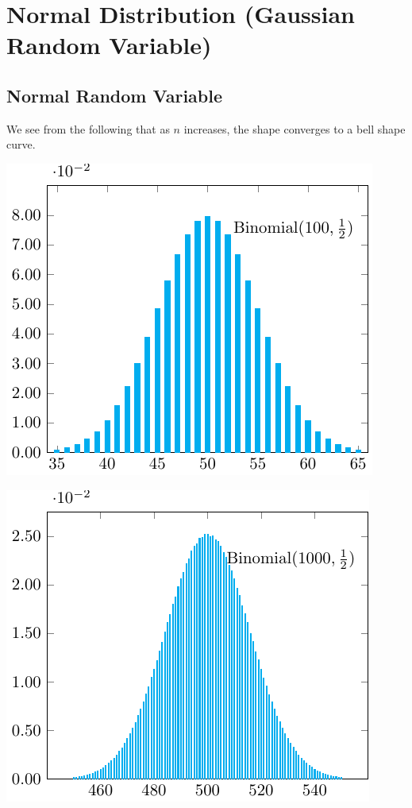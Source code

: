 \section{Normal Distribution (Gaussian Random Variable)}
\subsection{Normal Random Variable}
We see from the following that as \(n\) increases, the shape converges to a bell shape curve.

\begin{minipage}{0.5\textwidth}
    \includegraphics{Figures/normal-random-1.pdf}
\end{minipage}
\begin{minipage}{0.5\textwidth}
    \includegraphics{Figures/normal-random-2.pdf}
\end{minipage}

